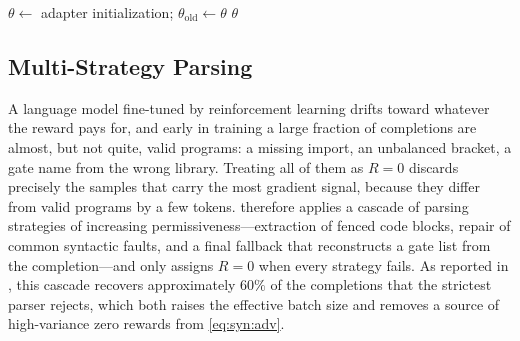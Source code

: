 \begin{algorithm}[htbp]
\caption{\rubriq{} rubric-guided GRPO fine-tuning.}
\label{alg:syn:rubriq}
$\theta\leftarrow$ adapter initialization; $\theta_{\mathrm{old}}\leftarrow\theta$\;
\Return $\theta$\;
\end{algorithm}

\subsection{Multi-Strategy Parsing}\label{sec:syn:parsing}

A language model fine-tuned by reinforcement learning drifts toward whatever the reward pays for, and early in training a large fraction of completions are almost, but not quite, valid programs: a missing import, an unbalanced bracket, a gate name from the wrong library. Treating all of them as $R=0$ discards precisely the samples that carry the most gradient signal, because they differ from valid programs by a few tokens. \rubriq{} therefore applies a cascade of parsing strategies of increasing permissiveness---extraction of fenced code blocks, repair of common syntactic faults, and a final fallback that reconstructs a gate list from the completion---and only assigns $R=0$ when every strategy fails. As reported in \cite{guo2026rubriq}, this cascade recovers approximately $60\%$ of the completions that the strictest parser rejects, which both raises the effective batch size and removes a source of high-variance zero rewards from \cref{eq:syn:adv}.

